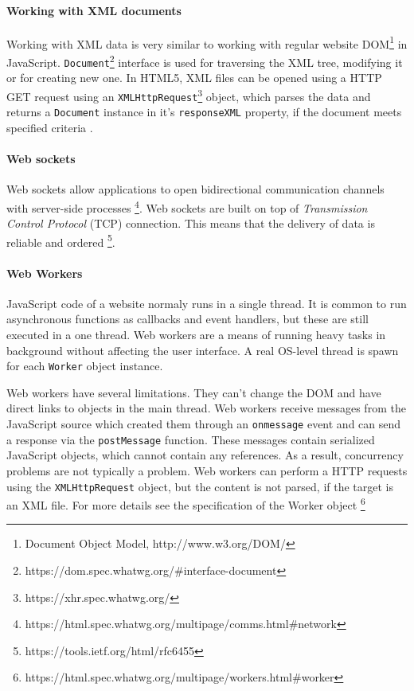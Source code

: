 \paragraph{Working with XML documents}
Working with XML data is very similar to working with regular website DOM\footnote{Document Object Model, http://www.w3.org/DOM/} in JavaScript. \verb|Document|\footnote{https://dom.spec.whatwg.org/\#interface-document} interface is used for traversing the XML tree, modifying it or for creating new one. In HTML5, XML files can be opened using a HTTP GET request using an \verb|XMLHttpRequest|\footnote{https://xhr.spec.whatwg.org/} object, which parses the data and returns a \verb|Document| instance in it's \verb|responseXML| property, if the document meets specified criteria \cite{xhr}.

\paragraph{Web sockets}
Web sockets allow applications to open bidirectional communication channels with server-side processes \cite{}\footnote{https://html.spec.whatwg.org/multipage/comms.html\#network}. Web sockets are built on top of \textit{Transmission Control Protocol} (TCP) connection. This means that the delivery of data is reliable and ordered \cite{}\footnote{https://tools.ietf.org/html/rfc6455}.

\paragraph{Web Workers}
JavaScript code of a website normaly runs in a single thread. It is common to run asynchronous functions as callbacks and event handlers, but these are still executed in a one thread. Web workers are a means of running heavy tasks in background without affecting the user interface. A real OS-level thread is spawn for each \verb|Worker| object instance.

Web workers have several limitations. They can't change the DOM and have direct links to objects in the main thread. Web workers receive messages from the JavaScript source which created them through an \verb|onmessage| event and can send a response via the \verb|postMessage| function. These messages contain serialized JavaScript objects, which cannot contain any references. As a result, concurrency problems are not typically a problem. Web workers can perform a HTTP requests using the \verb|XMLHttpRequest| object, but the content is not parsed, if the target is an XML file. For more details see the specification of the Worker object\cite{} \footnote{https://html.spec.whatwg.org/multipage/workers.html\#worker}





